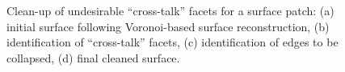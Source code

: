 \begin{figure}
{\label{fig:cross1-2}}
%
\caption{Clean-up of undesirable ``cross-talk'' facets for a surface patch: (a) initial surface following Voronoi-based surface reconstruction, (b) identification of ``cross-talk'' facets, (c) identification of edges to be collapsed, (d) final cleaned surface.}
\label{fig:cross1}
\end{figure}

